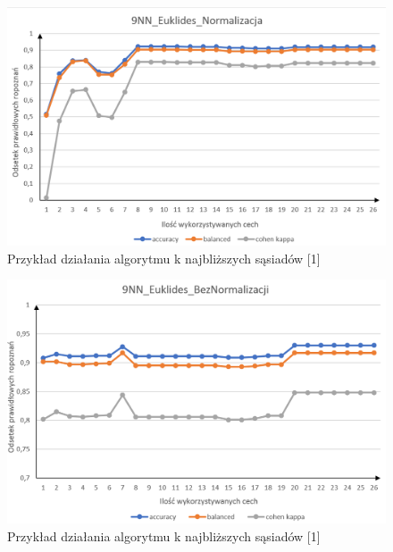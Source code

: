 \documentclass[12pt]{article}
\begin{document}
\begin{figure}[H]
	\centering
		\includegraphics[scale=0.66]{images/metrics/9nn_euklides_norm.png}
	\caption{Przykład działania algorytmu k najbliższych sąsiadów [1]}
\end{figure}
\begin{figure}[H]
	\centering
		\includegraphics[scale=0.66]{images/metrics/9nn_euklides_beznorm.png}
	\caption{Przykład działania algorytmu k najbliższych sąsiadów [1]}
\end{figure}
\end{document}
